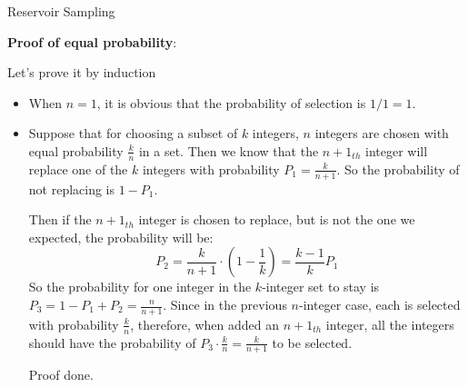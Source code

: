 \documentclass[12pt, a4paper]{article}
\begin{document}
\begin{algorithm}[!htb]
    \caption{Reservoir Sampling}

\end{algorithm}

\textbf{Proof of equal probability}:

Let's prove it by induction
\begin{itemize}
    \item When $n = 1$, it is obvious that the probability of selection is $1/1 = 1$.
    \item Suppose that for choosing a subset of $k$ integers, $n$ integers are chosen with equal probability $\frac{k}{n}$ in a set. 
          Then we know that the $n+1_{th}$ integer will replace one of the $k$ integers with probability $P_1 = \frac{k}{n+1}$. 
          So the probability of not replacing is $1 - P_1$. 

          Then if the $n+1_{th}$ integer is chosen to replace, but is not the one we expected, the probability will be:
          $$P_2 = \frac{k}{n+1} \cdot (1 - \frac{1}{k}) = \frac{k-1}{k}P_1$$
          So the probability for one integer in the $k$-integer set to stay is $P_3 = 1 - P_1 + P_2 = \frac{n}{n+1}$.
          Since in the previous $n$-integer case, each is selected with probability $\frac{k}{n}$, therefore, 
          when added an $n+1_{th}$ integer, all the integers should have the probability of $P_3\cdot \frac{k}{n} = \frac{k}{n+1}$ to be selected. 

          Proof done.
\end{itemize}
\end{document}
